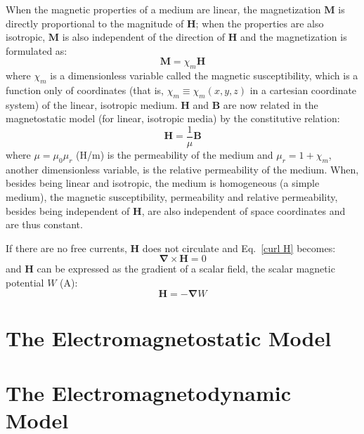 When the magnetic properties of a medium are linear, the magnetization $\mathbf{M}$ is directly proportional to the magnitude of $\mathbf{H}$; when the properties are  also isotropic, $\mathbf{M}$ is also independent of the direction of $\mathbf{H}$ and the magnetization is formulated as:
\begin{equation}\label{chi m}
\mathbf{M} = \chi_m \mathbf{H}
\end{equation}
{\noindent}where $\chi_m$ is a dimensionless variable called the magnetic susceptibility, which is a function only of coordinates (that is, $\chi_m \equiv \chi_m(x,y,z)$ in a cartesian coordinate system) of the linear, isotropic medium.
{\noindent}$\mathbf{H}$ and $\mathbf{B}$ are now related in the magnetostatic model (for linear, isotropic media) by the constitutive relation:
\begin{equation}\label{H chi m}
\mathbf{H} = \frac{1}{\mu} \mathbf{B}
\end{equation}
{\noindent}where $\mu = \mu_0 \mu_r$ (H/m) is the permeability of the medium and $\mu_r =  1 + \chi_m$, another dimensionless variable, is the relative permeability of the medium.  When, besides being linear and isotropic, the medium is homogeneous (a simple medium), the magnetic susceptibility, permeability and relative permeability, besides being independent of $\mathbf{H}$, are also independent of space coordinates and are thus constant.

If there are no free currents, $\mathbf{H}$ does not circulate and Eq.~\ref{curl H} becomes:
\begin{equation}\label{curl H J=0}
\mathbf{\nabla} \times \mathbf{H} = 0
\end{equation}
{\noindent}and $\mathbf{H}$ can be expressed as the gradient of a scalar field, the scalar magnetic potential $W$ (A):
\begin{equation}\label{grad W}
\mathbf{H} = -\mathbf{\nabla}W
\end{equation}


\section{The Electromagnetostatic Model}\label{sec:electromagnetostatics}

\section{The Electromagnetodynamic Model}\label{sec:electromagnetodynamics}

